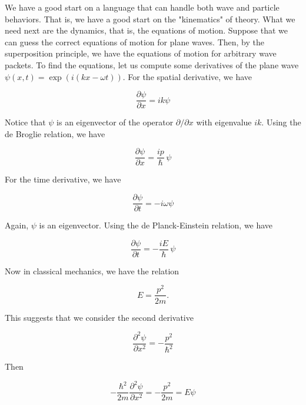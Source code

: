 We have a good start on a language that can handle both wave and particle behaviors.  That is, we have a good start on the "kinematics" of theory.  What we need next are the dynamics, that is, the equations of motion.  Suppose that we can guess the correct equations of motion for plane waves.  Then, by the superposition principle, we have the equations of motion for arbitrary wave packets.  To find the equations, let us compute some derivatives of the plane wave $\psi(x,t) = \exp(i(kx - \omega t))$.  For the spatial derivative, we have

\begin{equation}
\frac{\partial\psi}{\partial x} = ik\psi
\end{equation}

Notice that $\psi$ is an eigenvector of the operator $\partial/\partial x$ with eigenvalue $ik$. Using the de Broglie relation, we have

\begin{equation}
\frac{\partial\psi}{\partial x} = \frac{ip}{\hbar}\,\psi
\end{equation}

For the time derivative, we have

\begin{equation}
\frac{\partial\psi}{\partial t} = -i\omega\psi
\end{equation}

Again, $\psi$ is an eigenvector. Using the de Planck-Einstein relation, we have

\begin{equation}
\label{spsix}
\frac{\partial\psi}{\partial t} = -\frac{iE}{\hbar}\,\psi
\end{equation}

Now in classical mechanics, we have the relation

\begin{equation}
E = \frac{p^2}{2m}.
\end{equation}

This suggests that we consider the second derivative



\begin{equation}
\frac{\partial^2 \psi}{\partial x^2} = - \frac{p^2} { \hbar^2}
\end{equation}

Then

\begin{equation}
-\frac{\hbar^2}{2m} \frac{\partial^2 \psi}{\partial x^2} = - \frac{p^2} { 2m} = E\psi
\end{equation}

